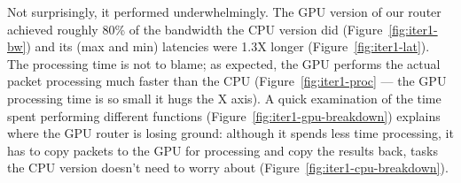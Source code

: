 Not surprisingly, it performed underwhelmingly. The GPU version of our router
achieved roughly 80\% of the bandwidth the CPU version did
(Figure~\ref{fig:iter1-bw}) and its (max and min) latencies were 1.3X longer
(Figure~\ref{fig:iter1-lat}). The processing time is not to blame; as expected,
the GPU performs the actual packet processing much faster than the CPU
(Figure~\ref{fig:iter1-proc} --- the GPU processing time is so small it hugs
the X axis). A quick examination of the time spent performing different
functions (Figure~\ref{fig:iter1-gpu-breakdown}) explains where the GPU router
is losing ground: although it spends less time processing, it has to copy
packets to the GPU for processing and copy the results back, tasks the CPU
version doesn't need to worry about (Figure~\ref{fig:iter1-cpu-breakdown}).

\begin{figure}
    \centering
	\medskip


	\medskip
    
	\medskip
	

\end{figure}
